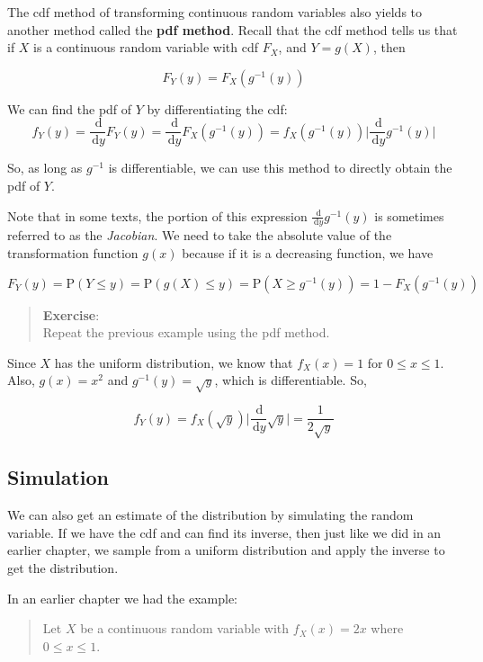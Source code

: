 \documentclass[
  letterpaper,
  DIV=11,
  numbers=noendperiod]{scrreprt}
\begin{document}
The cdf method of transforming continuous random variables also yields
to another method called the \textbf{pdf method}. Recall that the cdf
method tells us that if \(X\) is a continuous random variable with cdf
\(F_X\), and \(Y=g(X)\), then

\[
F_Y(y)=F_X(g^{-1}(y))
\]

We can find the pdf of \(Y\) by differentiating the cdf: \[
f_Y(y)=\frac{\,\mathrm{d}}{\,\mathrm{d}y}F_Y(y)=\frac{\,\mathrm{d}}{\,\mathrm{d}y} F_X(g^{-1}(y)) = f_X(g^{-1}(y))\bigg| \frac{\,\mathrm{d}}{\,\mathrm{d}y}  g^{-1}(y) \bigg|
\]

So, as long as \(g^{-1}\) is differentiable, we can use this method to
directly obtain the pdf of \(Y\).

Note that in some texts, the portion of this expression
\(\frac{\,\mathrm{d}}{\,\mathrm{d}y} g^{-1}(y)\) is sometimes referred
to as the \emph{Jacobian}. We need to take the absolute value of the
transformation function \(g(x)\) because if it is a decreasing function,
we have

\[
F_Y(y)=\mbox{P}(Y\leq y)=\mbox{P}(g(X) \leq y)=\mbox{P}(X \geq g^{-1}(y))= 1 - F_X(g^{-1}(y))
\]

\begin{quote}
\textbf{Exercise}:\\
Repeat the previous example using the pdf method.
\end{quote}

Since \(X\) has the uniform distribution, we know that \(f_X(x)=1\) for
\(0\leq x \leq 1\). Also, \(g(x)=x^2\) and \(g^{-1}(y)=\sqrt{y}\), which
is differentiable. So,

\[
f_Y(y)=f_X(\sqrt{y})\bigg|\frac{\,\mathrm{d}}{\,\mathrm{d}y} \sqrt{y}\bigg| = \frac{1}{2\sqrt{y}}
\]

\subsection{Simulation}\label{simulation-2}

We can also get an estimate of the distribution by simulating the random
variable. If we have the cdf and can find its inverse, then just like we
did in an earlier chapter, we sample from a uniform distribution and
apply the inverse to get the distribution.

In an earlier chapter we had the example:

\begin{quote}
Let \(X\) be a continuous random variable with \(f_X(x)=2x\) where
\(0 \leq x \leq 1\).
\end{quote}
\end{document}
